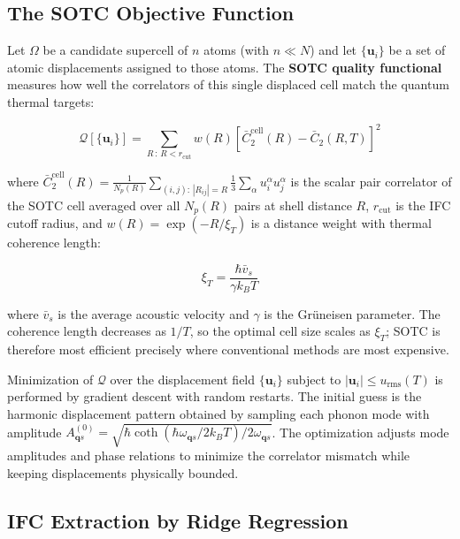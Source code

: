 \documentclass[aps,prb,reprint,amsmath,amssymb,floatfix]{revtex4-2}
\begin{document}
\subsection{The SOTC Objective
Function}\label{the-sotc-objective-function}

Let \(\Omega\) be a candidate supercell of \(n\) atoms (with
\(n \ll N\)) and let \(\{\mathbf{u}_i\}\) be a set of atomic
displacements assigned to those atoms. The \textbf{SOTC quality
functional} measures how well the correlators of this single displaced
cell match the quantum thermal targets:

\begin{equation}
\mathcal{Q}[\{\mathbf{u}_i\}] = \sum_{R\,:\,R<r_\text{cut}} w(R) \left[\bar{C}_{2}^\text{cell}(R) - \bar{C}_{2}(R,T)\right]^2 \tag{4}
\end{equation}

where
\(\bar{C}_{2}^\text{cell}(R) = \frac{1}{N_p(R)}\sum_{(i,j):\,|R_{ij}|=R}\frac{1}{3}\sum_\alpha u_i^\alpha u_j^\alpha\)
is the scalar pair correlator of the SOTC cell averaged over all
\(N_p(R)\) pairs at shell distance \(R\), \(r_\text{cut}\) is the IFC
cutoff radius, and \(w(R) = \exp(-R/\xi_T)\) is a distance weight with
thermal coherence length:

\begin{equation}
\xi_T = \frac{\hbar\bar{v}_s}{\gamma k_B T} \tag{5}
\end{equation}

where \(\bar{v}_s\) is the average acoustic velocity and \(\gamma\) is
the Grüneisen parameter. The coherence length decreases as \(1/T\), so
the optimal cell size scales as \(\xi_T\); SOTC is therefore most
efficient precisely where conventional methods are most expensive.

Minimization of \(\mathcal{Q}\) over the displacement field
\(\{\mathbf{u}_i\}\) subject to \(|\mathbf{u}_i| \leq u_\text{rms}(T)\)
is performed by gradient descent with random restarts. The initial guess
is the harmonic displacement pattern obtained by sampling each phonon
mode with amplitude
\(A_{\mathbf{q}s}^{(0)} = \sqrt{\hbar\coth(\hbar\omega_{\mathbf{q}s}/2k_BT)/2\omega_{\mathbf{q}s}}\).
The optimization adjusts mode amplitudes and phase relations to minimize
the correlator mismatch while keeping displacements physically bounded.

\subsection{IFC Extraction by Ridge
Regression}\label{ifc-extraction-by-ridge-regression}
\end{document}

